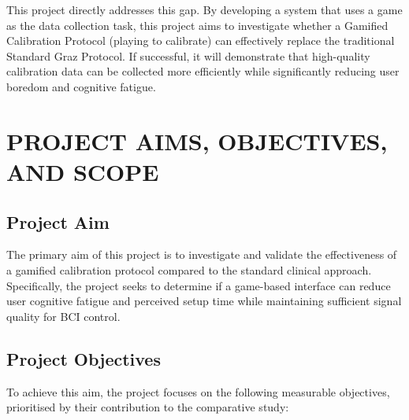\documentclass[a4paper, 11pt, openany]{report}
\begin{document}
    This project directly addresses this gap. By developing a system that uses a 
    game as the data collection task, this project aims to investigate 
    whether a Gamified Calibration Protocol (playing to calibrate) can 
    effectively replace the traditional Standard Graz Protocol. If successful, 
    it will demonstrate that high-quality calibration data can be collected more 
    efficiently while significantly reducing user boredom and cognitive fatigue.


\chapter{PROJECT AIMS, OBJECTIVES, AND SCOPE}   

    \section{Project Aim}    
    The primary aim of this project is to investigate and validate the effectiveness 
    of a gamified calibration protocol compared to the standard clinical approach. 
    Specifically, the project seeks to determine if a game-based interface can 
    reduce user cognitive fatigue and perceived setup time while maintaining 
    sufficient signal quality for BCI control.

    \section{Project Objectives}    
    To achieve this aim, the project focuses on the following measurable objectives, 
    prioritised by their contribution to the comparative study:
    
\end{document}
